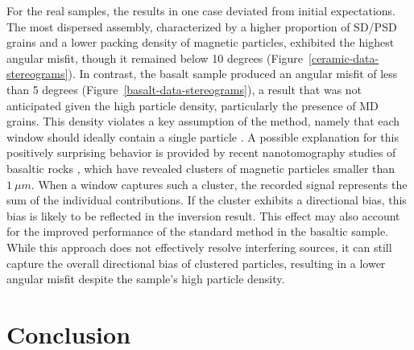 \documentclass[onecolumn,12pt,a4paper]{article}
\begin{document}
For the real samples, the results in one case deviated from initial expectations. The most dispersed assembly, characterized by a higher proportion of SD/PSD grains and a lower packing density of magnetic particles, exhibited the highest angular misfit, though it remained below 10 degrees (Figure~\ref{ceramic-data-stereograms}). In contrast, the basalt sample produced an angular misfit of less than 5 degrees (Figure~\ref{basalt-data-stereograms}), a result that was not anticipated given the high particle density, particularly the presence of MD grains. This density violates a key assumption of the method, namely that each window should ideally contain a single particle \citep{Souza-Junior2024}. A possible explanation for this positively surprising behavior is provided by recent nanotomography studies of basaltic rocks \citep[\textit{e.g.}][]{Out2024, Out2025}, which have revealed clusters of magnetic particles smaller than \(1~\mu m\). When a window captures such a cluster, the recorded signal represents the sum of the individual contributions. If the cluster exhibits a directional bias, this bias is likely to be reflected in the inversion result. This effect may also account for the improved performance of the standard method in the basaltic sample. While this approach does not effectively resolve interfering sources, it can still capture the overall directional bias of clustered particles, resulting in a lower angular misfit despite the sample’s high particle density.


\section{Conclusion}
\end{document}

